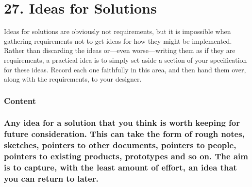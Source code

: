 \documentclass[
]{article}
\begin{document}
\hypertarget{ideas-for-solutions}{%
\section{27. Ideas for Solutions}\label{ideas-for-solutions}}

Ideas for solutions are obviously not requirements, but it is impossible
when gathering requirements not to get ideas for how they might be
implemented. Rather than discarding the ideas or---even worse---writing
them as if they are requirements, a practical idea is to simply set
aside a section of your specification for these ideas. Record each one
faithfully in this area, and then hand them over, along with the
requirements, to your designer.

\hypertarget{content-77}{%
\subsubsection{Content}\label{content-77}}

\hypertarget{any-idea-for-a-solution-that-you-think-is-worth-keeping-for-future-consideration.-this-can-take-the-form-of-rough-notes-sketches-pointers-to-other-documents-pointers-to-people-pointers-to-existing-products-prototypes-and-so-on.-the-aim-is-to-capture-with-the-least-amount-of-effort-an-idea-that-you-can-return-to-later.}{%
\subsubsection{\texorpdfstring{Any idea for a solution that you think is
worth keeping for future consideration. This can take the form of rough
notes, sketches, pointers to other documents, pointers to people,
pointers to existing products, prototypes and so on. The aim is to
capture, with the least amount of effort, an idea that you can return to
later.
}{Any idea for a solution that you think is worth keeping for future consideration. This can take the form of rough notes, sketches, pointers to other documents, pointers to people, pointers to existing products, prototypes and so on. The aim is to capture, with the least amount of effort, an idea that you can return to later. }}\label{any-idea-for-a-solution-that-you-think-is-worth-keeping-for-future-consideration.-this-can-take-the-form-of-rough-notes-sketches-pointers-to-other-documents-pointers-to-people-pointers-to-existing-products-prototypes-and-so-on.-the-aim-is-to-capture-with-the-least-amount-of-effort-an-idea-that-you-can-return-to-later.}}
\end{document}
